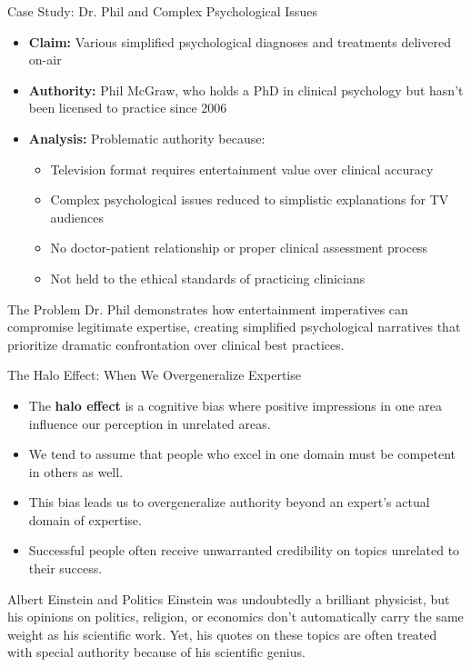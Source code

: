 \documentclass{beamer}
\begin{document}
\begin{frame}{Case Study: Dr. Phil and Complex Psychological Issues}
	\begin{itemize}
		\item \textbf{Claim:} Various simplified psychological diagnoses and treatments delivered on-air
		\item \textbf{Authority:} Phil McGraw, who holds a PhD in clinical psychology but hasn't been licensed to practice since 2006
		\item \textbf{Analysis:} Problematic authority because:
		\begin{itemize}
			\item Television format requires entertainment value over clinical accuracy
			\item Complex psychological issues reduced to simplistic explanations for TV audiences
			\item No doctor-patient relationship or proper clinical assessment process
			\item Not held to the ethical standards of practicing clinicians
		\end{itemize}
	\end{itemize}
	
	\begin{alertblock}{The Problem}
		Dr. Phil demonstrates how entertainment imperatives can compromise legitimate expertise, creating simplified psychological narratives that prioritize dramatic confrontation over clinical best practices.
	\end{alertblock}
\end{frame}

\begin{frame}{The Halo Effect: When We Overgeneralize Expertise}
    \begin{itemize}
        \item The \textbf{halo effect} is a cognitive bias where positive impressions in one area influence our perception in unrelated areas.
        \item We tend to assume that people who excel in one domain must be competent in others as well.
        \item This bias leads us to overgeneralize authority beyond an expert's actual domain of expertise.
        \item Successful people often receive unwarranted credibility on topics unrelated to their success.
    \end{itemize}
    
    \begin{example}{Albert Einstein and Politics}
        Einstein was undoubtedly a brilliant physicist, but his opinions on politics, religion, or economics don't automatically carry the same weight as his scientific work. Yet, his quotes on these topics are often treated with special authority because of his scientific genius.
    \end{example}
\end{frame}
\end{document}
